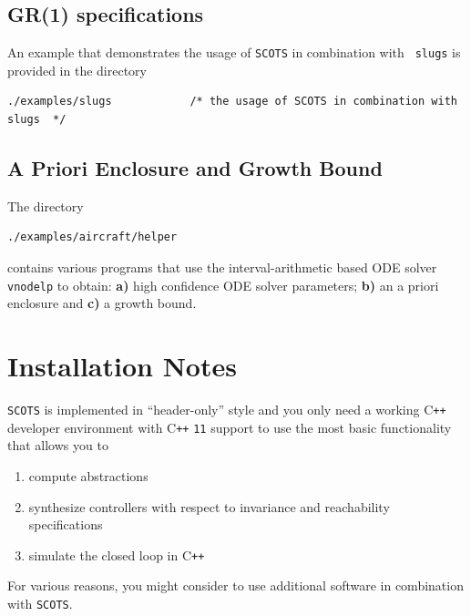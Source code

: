 \documentclass[a4paper]{amsart}
\newcommand\Cpp{C\texttt{++} }
\begin{document}
\subsection{GR(1) specifications}
An example that demonstrates the usage of {\tt SCOTS} in combination with {\tt
slugs} is provided in the directory
\begin{lstlisting}[basicstyle=\small\ttfamily]
./examples/slugs        	/* the usage of SCOTS in combination with slugs  */ 
\end{lstlisting}


\subsection{A Priori Enclosure and Growth Bound}
The directory 
\begin{lstlisting}[basicstyle=\small\ttfamily]
./examples/aircraft/helper        	
\end{lstlisting}
contains various programs that 
use the interval-arithmetic based ODE solver {\tt vnodelp} to obtain: {\bf a)} high
confidence ODE solver parameters; {\bf b)} an a priori enclosure and {\bf c)} a growth
bound.


\newpage
\section{Installation Notes}
\label{s:req}

{\tt SCOTS} is implemented in ``header-only'' style and you only
need a working \Cpp developer environment with \Cpp{\tt11} support to use the
most basic functionality that allows you to
\begin{enumerate}
  \item compute abstractions
  \item synthesize controllers with respect to invariance and reachability specifications 
  \item simulate the closed loop in \Cpp
\end{enumerate}
For various reasons, you might consider to use additional software in combination with {\tt SCOTS}.
\end{document}
